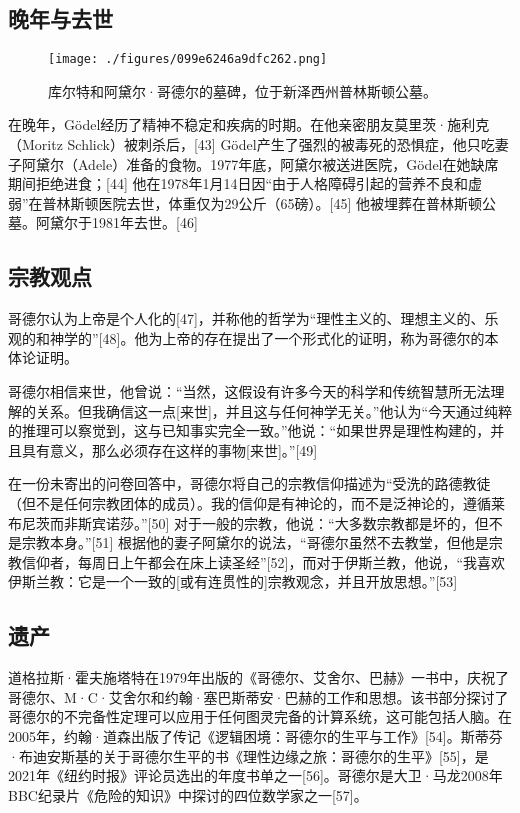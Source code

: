 \subsection{晚年与去世}
\begin{figure}[ht]
\centering
\texttt{[image: ./figures/099e6246a9dfc262.png]}
\caption{库尔特和阿黛尔·哥德尔的墓碑，位于新泽西州普林斯顿公墓。} \label{fig_KRT_4}
\end{figure}
在晚年，Gödel经历了精神不稳定和疾病的时期。在他亲密朋友莫里茨·施利克（Moritz Schlick）被刺杀后，[43] Gödel产生了强烈的被毒死的恐惧症，他只吃妻子阿黛尔（Adele）准备的食物。1977年底，阿黛尔被送进医院，Gödel在她缺席期间拒绝进食；[44] 他在1978年1月14日因“由于人格障碍引起的营养不良和虚弱”在普林斯顿医院去世，体重仅为29公斤（65磅）。[45] 他被埋葬在普林斯顿公墓。阿黛尔于1981年去世。[46]
\subsection{宗教观点}  
哥德尔认为上帝是个人化的[47]，并称他的哲学为“理性主义的、理想主义的、乐观的和神学的”[48]。他为上帝的存在提出了一个形式化的证明，称为哥德尔的本体论证明。

哥德尔相信来世，他曾说：“当然，这假设有许多今天的科学和传统智慧所无法理解的关系。但我确信这一点[来世]，并且这与任何神学无关。”他认为“今天通过纯粹的推理可以察觉到，这与已知事实完全一致。”他说：“如果世界是理性构建的，并且具有意义，那么必须存在这样的事物[来世]。”[49]

在一份未寄出的问卷回答中，哥德尔将自己的宗教信仰描述为“受洗的路德教徒（但不是任何宗教团体的成员）。我的信仰是有神论的，而不是泛神论的，遵循莱布尼茨而非斯宾诺莎。”[50] 对于一般的宗教，他说：“大多数宗教都是坏的，但不是宗教本身。”[51] 根据他的妻子阿黛尔的说法，“哥德尔虽然不去教堂，但他是宗教信仰者，每周日上午都会在床上读圣经”[52]，而对于伊斯兰教，他说，“我喜欢伊斯兰教：它是一个一致的[或有连贯性的]宗教观念，并且开放思想。”[53]
\subsection{遗产}  
道格拉斯·霍夫施塔特在1979年出版的《哥德尔、艾舍尔、巴赫》一书中，庆祝了哥德尔、M·C·艾舍尔和约翰·塞巴斯蒂安·巴赫的工作和思想。该书部分探讨了哥德尔的不完备性定理可以应用于任何图灵完备的计算系统，这可能包括人脑。在2005年，约翰·道森出版了传记《逻辑困境：哥德尔的生平与工作》[54]。斯蒂芬·布迪安斯基的关于哥德尔生平的书《理性边缘之旅：哥德尔的生平》[55]，是2021年《纽约时报》评论员选出的年度书单之一[56]。哥德尔是大卫·马龙2008年BBC纪录片《危险的知识》中探讨的四位数学家之一[57]。

